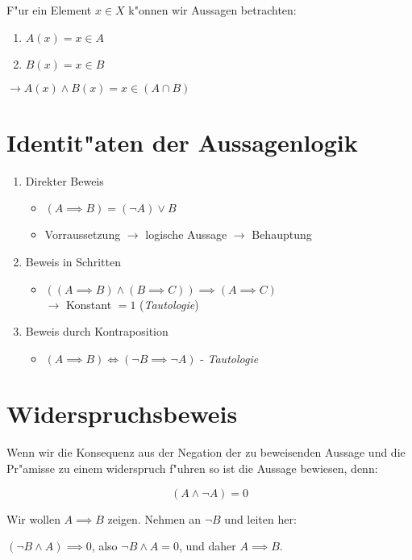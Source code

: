 \documentclass[fontsize=11pt,paper=a4,BCOR=0mm,DIV=11,automark,headsepline]{scrbook}
\theoremstyle{remark}
\theoremstyle{definition}
\theoremstyle{proof}
\theoremstyle{remark}
\begin{document}
\begin{exa}
F"ur ein Element \(x\in X\) k"onnen wir Aussagen betrachten:
\begin{enumerate}
\item \(A(x)=x\in A\)
\item \(B(x)=x\in B\)
\end{enumerate}
\(\longrightarrow A(x)\wedge B(x)=x\in (A\cap B)\)
\end{exa}

\section{Identit"aten der Aussagenlogik}
\label{sec:orgd743b6e}
\begin{relation}
\begin{enumerate}
\item Direkter Beweis 
\begin{itemize}
\item \((A\implies B) = (\neg A)\vee B\)
\item Vorraussetzung \(\rightarrow\) logische Aussage \(\rightarrow\) Behauptung
\end{itemize}
\item Beweis in Schritten
\begin{itemize}
\item \(((A\implies B)\wedge (B\implies C))\implies (A\implies C)\) \\
\(\rightarrow\) Konstant \(=1\) (\emph{Tautologie})
\end{itemize}
\item Beweis durch Kontraposition
\begin{itemize}
\item \((A\implies B) \iff (\neg B \implies \neg A)\) - \emph{Tautologie}
\end{itemize}
\end{enumerate}
\end{relation}

\section{Widerspruchsbeweis}
\label{sec:org54c9d02}
Wenn wir die Konsequenz aus der Negation der zu beweisenden Aussage und die
Pr"amisse zu einem widerspruch f"uhren so ist die Aussage bewiesen, denn:
\begin{relation}
\[(A\wedge \neg A)=0\]
\end{relation}


Wir wollen \(A\implies B\) zeigen.
Nehmen an \(\neg B\) und leiten her:\\
\begin{relation}
\((\neg B \wedge A)\implies 0\), also \(\neg B\wedge A = 0\), und daher \(A\implies
B\).
\end{relation}
\end{document}
